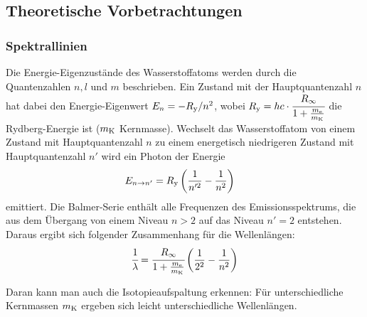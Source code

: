 \subsection{Theoretische Vorbetrachtungen}
\subsubsection{Spektrallinien}
Die Energie-Eigenzustände des Wasserstoffatoms werden durch die Quantenzahlen $n,l$ und $m$ beschrieben. Ein Zustand mit der Hauptquantenzahl $n$ hat dabei den Energie-Eigenwert $E_n=-R_\mathrm{y}/n^2$, wobei $R_\mathrm{y} = hc\cdot \cfrac{R_\infty}{1+\frac{m_\mathrm{e}}{m_\mathrm{K}}}$ die Rydberg-Energie ist ($m_\mathrm{K}$ Kernmasse). Wechselt das Wasserstoffatom von einem Zustand mit Hauptquantenzahl $n$ zu einem energetisch niedrigeren Zustand mit Hauptquantenzahl $n'$ wird ein Photon der Energie 
\begin{align*}
  E_{n \rightarrow n'}&=R_\mathrm{y} \left( \frac{1}{n'^2} - \frac{1}{n^2}\right)
\end{align*}
emittiert. Die Balmer-Serie enthält alle Frequenzen des Emissionsspektrums, die aus dem Übergang von einem Niveau $n>2$ auf das Niveau $n'=2$ entstehen. Daraus ergibt sich folgender Zusammenhang für die Wellenlängen:
\begin{align}
  \cfrac{1}{\lambda} = \cfrac{R_\infty}{1+\frac{m_\mathrm{e}}{m_\mathrm{K}}} \left( \frac{1}{2^2} - \frac{1}{n^2}\right)
  \label{equ:rydberg}
\end{align}

Daran kann man auch die Isotopieaufspaltung erkennen: Für unterschiedliche Kernmassen $m_\mathrm{K}$ ergeben sich leicht unterschiedliche Wellenlängen. 

